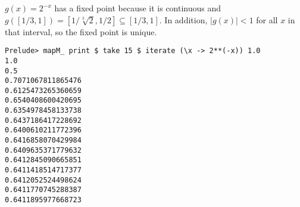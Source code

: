 $g(x) = 2^{-x}$ has a fixed point because it is continuous and $g([1/3,1]) =
[1/\sqrt[3]{2}, 1/2] \subseteq [1/3,1]$.  In addition, $|g(x)| < 1$ for all $x$
in that interval, so the fixed point is unique.

\begin{verbatim}
Prelude> mapM_ print $ take 15 $ iterate (\x -> 2**(-x)) 1.0
1.0
0.5
0.7071067811865476
0.6125473265360659
0.6540408600420695
0.6354978458133738
0.6437186417228692
0.6400610211772396
0.6416858070429984
0.6409635371779632
0.6412845090665851
0.6411418514717377
0.6412052524498624
0.6411770745288387
0.6411895977668723
\end{verbatim}
